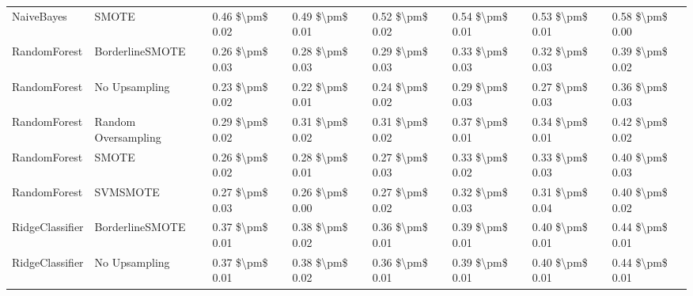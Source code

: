 \begin{tabular}{llllllll}
                     NaiveBayes &                         SMOTE & 0.46 \$\textbackslash pm\$ 0.02 &           0.49 \$\textbackslash pm\$ 0.01 &       0.52 \$\textbackslash pm\$ 0.02 &        0.54 \$\textbackslash pm\$ 0.01 &                         0.53 \$\textbackslash pm\$ 0.01 &     0.58 \$\textbackslash pm\$ 0.00 \\
                   RandomForest &               BorderlineSMOTE & 0.26 \$\textbackslash pm\$ 0.03 &           0.28 \$\textbackslash pm\$ 0.03 &       0.29 \$\textbackslash pm\$ 0.03 &        0.33 \$\textbackslash pm\$ 0.03 &                         0.32 \$\textbackslash pm\$ 0.03 &     0.39 \$\textbackslash pm\$ 0.02 \\
                   RandomForest &                 No Upsampling & 0.23 \$\textbackslash pm\$ 0.02 &           0.22 \$\textbackslash pm\$ 0.01 &       0.24 \$\textbackslash pm\$ 0.02 &        0.29 \$\textbackslash pm\$ 0.03 &                         0.27 \$\textbackslash pm\$ 0.03 &     0.36 \$\textbackslash pm\$ 0.03 \\
                   RandomForest &           Random Oversampling & 0.29 \$\textbackslash pm\$ 0.02 &           0.31 \$\textbackslash pm\$ 0.02 &       0.31 \$\textbackslash pm\$ 0.02 &        0.37 \$\textbackslash pm\$ 0.01 &                         0.34 \$\textbackslash pm\$ 0.01 &     0.42 \$\textbackslash pm\$ 0.02 \\
                   RandomForest &                         SMOTE & 0.26 \$\textbackslash pm\$ 0.02 &           0.28 \$\textbackslash pm\$ 0.01 &       0.27 \$\textbackslash pm\$ 0.03 &        0.33 \$\textbackslash pm\$ 0.02 &                         0.33 \$\textbackslash pm\$ 0.03 &     0.40 \$\textbackslash pm\$ 0.03 \\
                   RandomForest &                      SVMSMOTE & 0.27 \$\textbackslash pm\$ 0.03 &           0.26 \$\textbackslash pm\$ 0.00 &       0.27 \$\textbackslash pm\$ 0.02 &        0.32 \$\textbackslash pm\$ 0.03 &                         0.31 \$\textbackslash pm\$ 0.04 &     0.40 \$\textbackslash pm\$ 0.02 \\
                RidgeClassifier &               BorderlineSMOTE & 0.37 \$\textbackslash pm\$ 0.01 &           0.38 \$\textbackslash pm\$ 0.02 &       0.36 \$\textbackslash pm\$ 0.01 &        0.39 \$\textbackslash pm\$ 0.01 &                         0.40 \$\textbackslash pm\$ 0.01 &     0.44 \$\textbackslash pm\$ 0.01 \\
                RidgeClassifier &                 No Upsampling & 0.37 \$\textbackslash pm\$ 0.01 &           0.38 \$\textbackslash pm\$ 0.02 &       0.36 \$\textbackslash pm\$ 0.01 &        0.39 \$\textbackslash pm\$ 0.01 &                         0.40 \$\textbackslash pm\$ 0.01 &     0.44 \$\textbackslash pm\$ 0.01 \\

\end{tabular}

